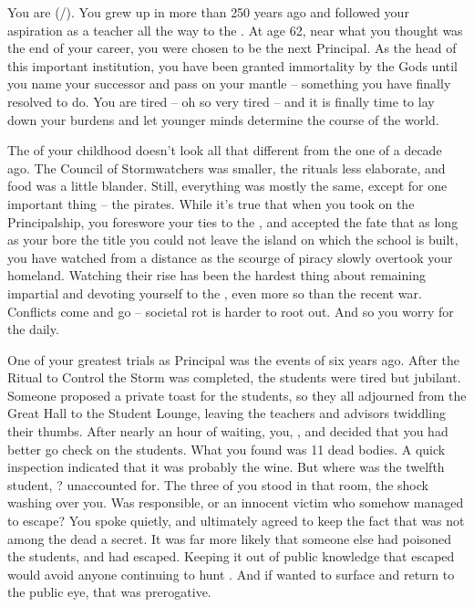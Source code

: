 \documentclass[char]{GL2020}
\begin{document}
\name{\cPrincipal{}}


You are \cPrincipal{\full} (\cPrincipal{\they}/\cPrincipal{\them}). You grew up in \pShip{} more than 250 years ago and followed your aspiration as a teacher all the way to the \pSchool{}. At age 62, near what you thought was the end of your career, you were chosen to be the next Principal. As the head of this important institution, you have been granted immortality by the Gods until you name your successor and pass on your mantle -- something you have finally resolved to do. You are tired -- oh so very tired -- and it is finally time to lay down your burdens and let younger minds determine the course of the world.

The \pShip{} of your childhood doesn't look all that different from the one of a decade ago. The Council of Stormwatchers was smaller, the rituals less elaborate, and food was a little blander. Still, everything was mostly the same, except for one important thing -- the pirates. While it's true that when you took on the Principalship, you foreswore your ties to the \pShippies{}, and accepted the fate that as long as your bore the title you could not leave the island on which the school is built, you have watched from a distance as the scourge of piracy slowly overtook your homeland. Watching their rise has been the hardest thing about remaining impartial and devoting yourself to the \pSc{}, even more so than the recent war. Conflicts come and go -- societal rot is harder to root out. And so you worry for the \pShip{} daily.

One of your greatest trials as Principal was the events of six years ago. After the Ritual to Control the Storm was completed, the students were tired but jubilant. Someone proposed a private toast for the students, so they all adjourned from the Great Hall to the Student Lounge, leaving the teachers and advisors twiddling their thumbs. After nearly an hour of waiting, you, \cDiplomat{\full}, and \cMusic{\full} decided that you had better go check on the students. What you found was 11 dead bodies. A quick inspection indicated that it was probably the wine. But where was the twelfth student, \cKidScientist{\full}? \cKidScientist{\They} \cKidScientist{\were} unaccounted for. The three of you stood in that room, the shock washing over you. Was \cKidScientist{} responsible, or \cKidScientist{\were} \cKidScientist{\they} an innocent victim who somehow managed to escape? You spoke quietly, and ultimately agreed to keep the fact that \cKidScientist{} was not among the dead a secret. It was far more likely that someone else had poisoned the students, and \cKidScientist{} had escaped. Keeping it out of public knowledge that \cKidScientist{\they} escaped would avoid anyone continuing to hunt \cKidScientist{\them}. And if \cKidScientist{\they} wanted to surface and return to the public eye, that was \cKidScientist{\their} prerogative. 
\end{document}
